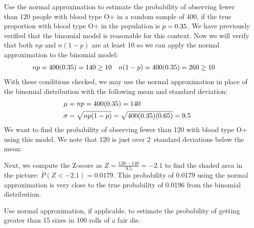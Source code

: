 \begin{examplewrap}
\begin{nexample}{Use the normal approximation to estimate the probability of observing fewer than 120 people with blood type O+ in a random sample of 400, if the true proportion with blood type O+ in the population is $p=0.35{}$.}
\label{approxBinomialForN400P20SmokerExample}%
We have previously verified that the binomial model is reasonable for this context.
Now we will verify that both $np$ and $n(1-p)$ are at least 10 so we can apply the normal approximation to the binomial model:
\begin{align*}
np&=400(0.35{})=140\ge 10
&
n(1-p)&=400(0.35{})=260\ge 10
\end{align*}
With these conditions checked, we may use the normal approximation in place of the binomial distribution with the following mean and standard deviation:
\begin{align*}
\mu &= np = 400(0.35{})=140\\
\sigma &= \sqrt{np(1-p)} = \sqrt{400(0.35{})(0.65{})}= 9.5
\end{align*}
We want to find the probability of observing fewer than 120 with blood type O+ using this model. We note that 120 is just over 2~standard deviations below the mean:
\begin{center}
\end{center}
Next, we compute the Z-score as $Z=\frac{120 - 140}{9.5} = -2.1$ to find the shaded area in the picture: $P(Z < -2.1) = 0.0179$. This probability of 0.0179 using the normal approximation is very close to the true probability of 0.0196 from the binomial distribution.
\end{nexample}
\end{examplewrap}

\begin{exercisewrap}
\begin{nexercise}
Use normal approximation, if applicable, to estimate the probability of getting greater than 15 sixes in 100 rolls of a fair die.\footnotemark
\end{nexercise}
\end{exercisewrap}


